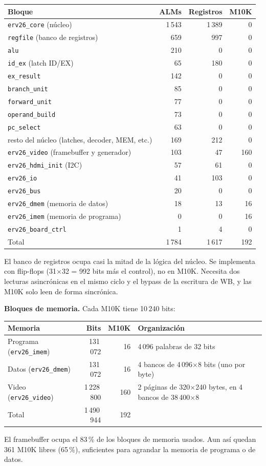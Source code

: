 \documentclass[11pt,a4paper]{article}
\newcommand{\code}[1]{\texttt{#1}}
\begin{document}
\begin{center}
\begin{tabular}{lrrr}
\toprule
Bloque & ALMs & Registros & M10K \\
\midrule
\code{erv26\_core} (núcleo) & 1\,543 & 1\,389 & 0 \\
\quad \code{regfile} (banco de registros) & 659 & 997 & 0 \\
\quad \code{alu} & 210 & 0 & 0 \\
\quad \code{id\_ex} (latch ID/EX) & 65 & 180 & 0 \\
\quad \code{ex\_result} & 142 & 0 & 0 \\
\quad \code{branch\_unit} & 85 & 0 & 0 \\
\quad \code{forward\_unit} & 77 & 0 & 0 \\
\quad \code{operand\_build} & 73 & 0 & 0 \\
\quad \code{pc\_select} & 63 & 0 & 0 \\
\quad resto del núcleo (latches, decoder, MEM, etc.) & 169 & 212 & 0 \\
\code{erv26\_video} (framebuffer y generador) & 103 & 47 & 160 \\
\code{erv26\_hdmi\_init} (I2C) & 57 & 61 & 0 \\
\code{erv26\_io} & 41 & 103 & 0 \\
\code{erv26\_bus} & 20 & 0 & 0 \\
\code{erv26\_dmem} (memoria de datos) & 18 & 13 & 16 \\
\code{erv26\_imem} (memoria de programa) & 0 & 0 & 16 \\
\code{erv26\_board\_ctrl} & 1 & 4 & 0 \\
\midrule
Total & 1\,784 & 1\,617 & 192 \\
\bottomrule
\end{tabular}
\end{center}

El banco de registros ocupa casi la mitad de la lógica del núcleo. Se implementa con flip-flops (31$\times$32 = 992 bits más el control), no en M10K. Necesita dos lecturas asincrónicas en el mismo ciclo y el bypass de la escritura de WB, y las M10K solo leen de forma sincrónica.

\textbf{Bloques de memoria.} Cada M10K tiene 10\,240 bits:

\begin{center}
\begin{tabularx}{\linewidth}{lrrL}
\toprule
Memoria & Bits & M10K & Organización \\
\midrule
Programa (\code{erv26\_imem}) & 131\,072 & 16 & 4\,096 palabras de 32 bits \\
Datos (\code{erv26\_dmem}) & 131\,072 & 16 & 4 bancos de 4\,096$\times$8 bits (uno por byte) \\
Video (\code{erv26\_video}) & 1\,228\,800 & 160 & 2 páginas de 320$\times$240 bytes, en 4 bancos de 38\,400$\times$8 \\
\midrule
Total & 1\,490\,944 & 192 & \\
\bottomrule
\end{tabularx}
\end{center}

El framebuffer ocupa el 83\,\% de los bloques de memoria usados. Aun así quedan 361 M10K libres (65\,\%), suficientes para agrandar la memoria de programa o de datos.
\end{document}
